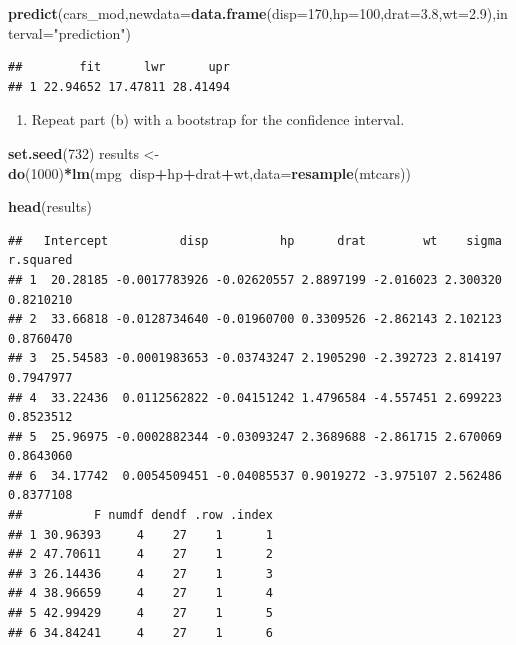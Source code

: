 \documentclass[
]{book}
\newenvironment{Shaded}{\begin{snugshade}}{\end{snugshade}}
\newcommand{\DataTypeTok}[1]{\textcolor[rgb]{0.13,0.29,0.53}{#1}}
\newcommand{\DecValTok}[1]{\textcolor[rgb]{0.00,0.00,0.81}{#1}}
\newcommand{\FloatTok}[1]{\textcolor[rgb]{0.00,0.00,0.81}{#1}}
\newcommand{\KeywordTok}[1]{\textcolor[rgb]{0.13,0.29,0.53}{\textbf{#1}}}
\newcommand{\NormalTok}[1]{#1}
\newcommand{\OperatorTok}[1]{\textcolor[rgb]{0.81,0.36,0.00}{\textbf{#1}}}
\newcommand{\StringTok}[1]{\textcolor[rgb]{0.31,0.60,0.02}{#1}}
\providecommand{\tightlist}{%
  \setlength{\itemsep}{0pt}\setlength{\parskip}{0pt}}
\begin{document}
\begin{Shaded}
\begin{Highlighting}[]
\KeywordTok{predict}\NormalTok{(cars_mod,}\DataTypeTok{newdata=}\KeywordTok{data.frame}\NormalTok{(}\DataTypeTok{disp=}\DecValTok{170}\NormalTok{,}\DataTypeTok{hp=}\DecValTok{100}\NormalTok{,}\DataTypeTok{drat=}\FloatTok{3.8}\NormalTok{,}\DataTypeTok{wt=}\FloatTok{2.9}\NormalTok{),}\DataTypeTok{interval=}\StringTok{"prediction"}\NormalTok{)}
\end{Highlighting}
\end{Shaded}

\begin{verbatim}
##        fit      lwr      upr
## 1 22.94652 17.47811 28.41494
\end{verbatim}

\begin{enumerate}
\def\labelenumi{\alph{enumi}.}
\setcounter{enumi}{2}
\tightlist
\item
  Repeat part (b) with a bootstrap for the confidence interval.
\end{enumerate}

\begin{Shaded}
\begin{Highlighting}[]
\KeywordTok{set.seed}\NormalTok{(}\DecValTok{732}\NormalTok{)}
\NormalTok{results <-}\StringTok{ }\KeywordTok{do}\NormalTok{(}\DecValTok{1000}\NormalTok{)}\OperatorTok{*}\KeywordTok{lm}\NormalTok{(mpg}\OperatorTok{~}\NormalTok{disp}\OperatorTok{+}\NormalTok{hp}\OperatorTok{+}\NormalTok{drat}\OperatorTok{+}\NormalTok{wt,}\DataTypeTok{data=}\KeywordTok{resample}\NormalTok{(mtcars))}
\end{Highlighting}
\end{Shaded}

\begin{Shaded}
\begin{Highlighting}[]
\KeywordTok{head}\NormalTok{(results)}
\end{Highlighting}
\end{Shaded}

\begin{verbatim}
##   Intercept          disp          hp      drat        wt    sigma r.squared
## 1  20.28185 -0.0017783926 -0.02620557 2.8897199 -2.016023 2.300320 0.8210210
## 2  33.66818 -0.0128734640 -0.01960700 0.3309526 -2.862143 2.102123 0.8760470
## 3  25.54583 -0.0001983653 -0.03743247 2.1905290 -2.392723 2.814197 0.7947977
## 4  33.22436  0.0112562822 -0.04151242 1.4796584 -4.557451 2.699223 0.8523512
## 5  25.96975 -0.0002882344 -0.03093247 2.3689688 -2.861715 2.670069 0.8643060
## 6  34.17742  0.0054509451 -0.04085537 0.9019272 -3.975107 2.562486 0.8377108
##          F numdf dendf .row .index
## 1 30.96393     4    27    1      1
## 2 47.70611     4    27    1      2
## 3 26.14436     4    27    1      3
## 4 38.96659     4    27    1      4
## 5 42.99429     4    27    1      5
## 6 34.84241     4    27    1      6
\end{verbatim}
\end{document}
